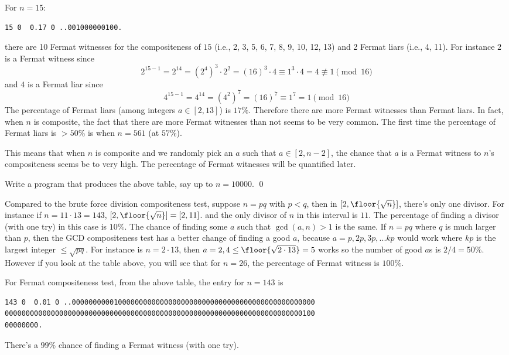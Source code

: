 For $n = 15$:
\begin{Verbatim}[frame=single,fontsize=\footnotesize]
  15 0  0.17 0 ..001000000100.
\end{Verbatim}
there are 10 Fermat witnesses for the compositeness of $15$
(i.e., 2, 3, 5, 6, 7, 8, 9, 10, 12, 13)
and 2 Fermat liars (i.e., 4, 11).
For instance $2$ is a Fermat witness since
\[
2^{15 - 1} = 2^{14} = (2^4)^3 \cdot 2^2 = (16)^3 \cdot 4 \equiv 1^3 \cdot 4 = 4 \not\equiv 1 \pmod{16}
\]
and $4$ is a Fermat liar since
\[
4^{15 - 1} = 4^{14} = (4^2)^7 = (16)^7 \equiv 1^7 = 1 \pmod{16}
\]
The percentage of Fermat liars (among integers $a \in [2, 13]$) is $17\%$.
Therefore there are more Fermat witnesses than Fermat liars.
In fact, when $n$ is composite,
the fact that there are more Fermat witnesses than not seems to be very common.
The first time the percentage of Fermat liars is $> 50\%$ is
when $n = 561$ (at $57\%$).

This means that when $n$ is composite
and we randomly pick an $a$ such that $a \in [2, n-2]$,
the chance that $a$ is a Fermat witness to $n$'s compositeness
seems be to very high.
The percentage of Fermat witnesses will be quantified later.


\begin{ex}
  Write a program that produces the above table, say up to $n = 10000$.
  \qed
\end{ex}


Compared to the brute force division compositeness test,
suppose $n = pq$ with $p < q$,
then in $[2, \floor{\sqrt{n}}]$, there's only one divisor.
For instance if $n = 11 \cdot 13 = 143$, $[2, \floor{\sqrt{n}}] = [2, 11]$.
and the only divisor of $n$ in this interval is $11$.
The percentage of finding a divisor (with one try) in this case is $10\%$.
The chance of finding some $a$ such that $\gcd(a, n) > 1$ is the same.
If $n = pq$ where $q$ is much larger than $p$, then the GCD compositeness
test has a better change of finding a good $a$, because
$a = p, 2p, 3p, ...kp$ would work where $kp$ is the largest integer
$\leq \sqrt{pq}$.
For instance is $n = 2 \cdot 13$, then $a = 2, 4 \leq \floor{\sqrt{2 \cdot 13}} = 5$ works
so the number of good $a$s is $2/4 = 50\%$.
However if you look at the table above, you will see that for $n = 26$,
the percentage of Fermat witness is $100\%$.

For Fermat compositeness test, from the above table,
the entry for $n = 143$ is
\begin{Verbatim}[frame=single,fontsize=\footnotesize]
143 0  0.01 0 ..0000000000100000000000000000000000000000000000000000000000
00000000000000000000000000000000000000000000000000000000000000000000000100
00000000.
\end{Verbatim}
There's a $99\%$ chance of finding a Fermat witness (with one try).


